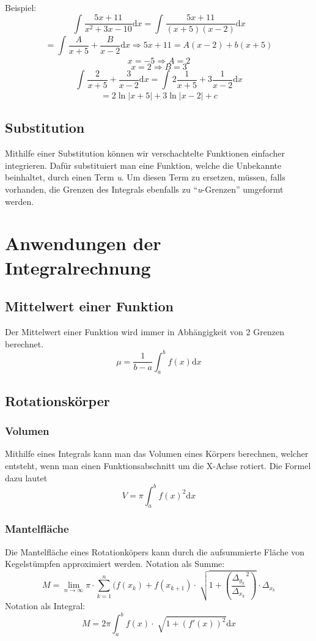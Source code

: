 \documentclass{article}
\begin{document}
Beispiel:
$$ \int_{}^{} \frac{5x+11}{x^{2}+3x-10} \mathrm{d}x = \int_{}^{} \frac{5x+11}{(x+5)(x-2)}  \mathrm{d}x $$
$$= \int_{}^{} \frac{A}{x+5} + \frac{B}{x-2}  \mathrm{d}x \Rightarrow 5x+11 = A(x-2)+b(x+5)$$
$$x = -5 \Rightarrow A = 2$$
$$x=2 \Rightarrow B = 3$$
$$ \int_{}^{} \frac{2}{x+5} + \frac{3}{x-2}  \mathrm{d}x = \int_{}^{} 2 \frac{1}{x+5} + 3 \frac{1}{x-2}  \mathrm{d}x $$
$$=2 \ln |x+5|+ 3\ln|x-2|+c$$


\subsection{Substitution}
Mithilfe einer Substitution können wir verschachtelte Funktionen einfacher integrieren. Dafür substituiert man eine Funktion, welche die Unbekannte beinhaltet, durch einen Term \textit{u}. Um diesen Term zu ersetzen, müssen, falls vorhanden, die Grenzen des Integrals ebenfalls zu ``\textit{u}-Grenzen'' umgeformt werden.

\section{Anwendungen der Integralrechnung}
\subsection{Mittelwert einer Funktion}
Der Mittelwert einer Funktion wird immer in Abhängigkeit von 2 Grenzen berechnet. $$\mu= \frac{1}{b-a} \int_{a}^{b} f(x) \mathrm{d}x  $$
\subsection{Rotationskörper}
\subsubsection{Volumen}
Mithilfe eines Integrals kann man das Volumen eines Körpers berechnen, welcher entsteht, wenn man einen Funktionsabschnitt um die X-Achse rotiert.
Die Formel dazu lautet
$$V= \pi \int_{a}^{b} f(x)^{2} \mathrm{d}x $$
\subsubsection{Mantelfläche}
Die Mantelfläche eines Rotationköpers kann durch die aufsummierte Fläche von Kegelstümpfen approximiert werden.
\newline
Notation als Summe:
$$M =  \lim_{n \to \infty} \pi \cdot \sum_{k=1}^{n} (f(x_k) + f(x_{k+1}) \cdot \sqrt[]{1+\left( \frac{\Delta_{y_k}}{\Delta_{x_k}}^{2} \right)} \cdot \Delta_{x_k}$$
Notation als Integral:
$$M = 2\pi \int_{a}^{b} f(x) \cdot \sqrt[]{1+(f'(x))^{2}} \mathrm{d}x $$
\end{document}
